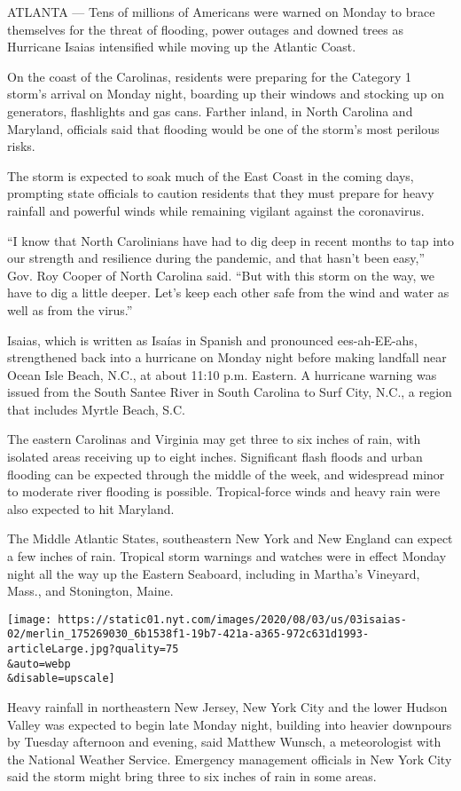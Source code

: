 ATLANTA --- Tens of millions of Americans were warned on Monday to brace
themselves for the threat of flooding, power outages and downed trees as
Hurricane Isaias intensified while moving up the Atlantic Coast.

On the coast of the Carolinas, residents were preparing for the Category
1 storm's arrival on Monday night, boarding up their windows and
stocking up on generators, flashlights and gas cans. Farther inland, in
North Carolina and Maryland, officials said that flooding would be one
of the storm's most perilous risks.

The storm is expected to soak much of the East Coast in the coming days,
prompting state officials to caution residents that they must prepare
for heavy rainfall and powerful winds while remaining vigilant against
the coronavirus.

``I know that North Carolinians have had to dig deep in recent months to
tap into our strength and resilience during the pandemic, and that
hasn't been easy,'' Gov. Roy Cooper of North Carolina said. ``But with
this storm on the way, we have to dig a little deeper. Let's keep each
other safe from the wind and water as well as from the virus.''

Isaias, which is written as Isaías in Spanish and pronounced
ees-ah-EE-ahs, strengthened back into a hurricane on Monday night before
making landfall near Ocean Isle Beach, N.C., at about 11:10 p.m.
Eastern. A hurricane warning was issued from the South Santee River in
South Carolina to Surf City, N.C., a region that includes Myrtle Beach,
S.C.

The eastern Carolinas and Virginia may get three to six inches of rain,
with isolated areas receiving up to eight inches. Significant flash
floods and urban flooding can be expected through the middle of the
week, and widespread minor to moderate river flooding is possible.
Tropical-force winds and heavy rain were also expected to hit Maryland.

The Middle Atlantic States, southeastern New York and New England can
expect a few inches of rain. Tropical storm warnings and watches were in
effect Monday night all the way up the Eastern Seaboard, including in
Martha's Vineyard, Mass., and Stonington, Maine.

\texttt{[image: https://static01.nyt.com/images/2020/08/03/us/03isaias-02/merlin\_175269030\_6b1538f1-19b7-421a-a365-972c631d1993-articleLarge.jpg?quality=75\\\&auto=webp\\\&disable=upscale]}

Heavy rainfall in northeastern New Jersey, New York City and the lower
Hudson Valley was expected to begin late Monday night, building into
heavier downpours by Tuesday afternoon and evening, said Matthew Wunsch,
a meteorologist with the National Weather Service. Emergency management
officials in New York City said the storm might bring three to six
inches of rain in some areas.

